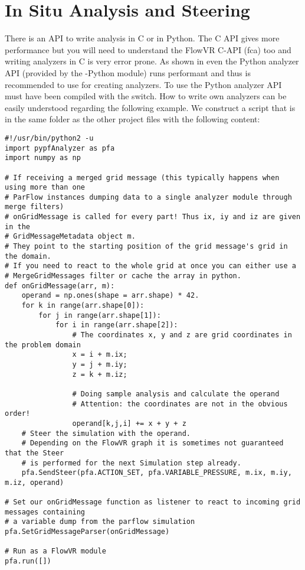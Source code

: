 \section{In Situ Analysis and Steering}
There is an API to write analysis in C or in Python. The C API gives more performance but you will
need to understand the FlowVR C-API (fca) too and writing analyzers in C is very error
prone. As shown in
\cite{thesisFriedemann2018} even the Python analyzer API
(provided by the -Python module) runs performant and thus is recommended to
use for creating analyzers. To use the Python analyzer API \parflow{} must have been compiled with
the  switch.
How to write own analyzers can be easily understood regarding the following example. We construct a
 script that is in the same folder as the other project files with the
following content:
\begin{display}\begin{verbatim}
#!/usr/bin/python2 -u
import pypfAnalyzer as pfa
import numpy as np

# If receiving a merged grid message (this typically happens when using more than one
# ParFlow instances dumping data to a single analyzer module through merge filters)
# onGridMessage is called for every part! Thus ix, iy and iz are given in the
# GridMessageMetadata object m.
# They point to the starting position of the grid message's grid in the domain.
# If you need to react to the whole grid at once you can either use a
# MergeGridMessages filter or cache the array in python.
def onGridMessage(arr, m):
    operand = np.ones(shape = arr.shape) * 42.
    for k in range(arr.shape[0]):
        for j in range(arr.shape[1]):
            for i in range(arr.shape[2]):
                # The coordinates x, y and z are grid coordinates in the problem domain
                x = i + m.ix;
                y = j + m.iy;
                z = k + m.iz;

                # Doing sample analysis and calculate the operand
                # Attention: the coordinates are not in the obvious order!
                operand[k,j,i] += x + y + z
    # Steer the simulation with the operand.
    # Depending on the FlowVR graph it is sometimes not guaranteed that the Steer
    # is performed for the next Simulation step already.
    pfa.SendSteer(pfa.ACTION_SET, pfa.VARIABLE_PRESSURE, m.ix, m.iy, m.iz, operand)

# Set our onGridMessage function as listener to react to incoming grid messages containing
# a variable dump from the parflow simulation
pfa.SetGridMessageParser(onGridMessage)

# Run as a FlowVR module
pfa.run([])
\end{verbatim}\end{display}

